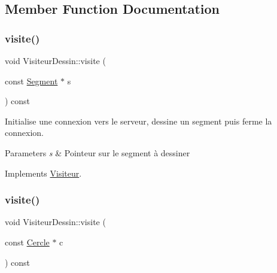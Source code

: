 \subsection{Member Function Documentation}
\mbox{\label{class_visiteur_dessin_a39d12a331fcc80c183fc706cdb2d394a}} 
\subsubsection{\texorpdfstring{visite()}{visite()}\hspace{0.1cm}{\footnotesize\ttfamily [1/5]}}
{\footnotesize\ttfamily void Visiteur\+Dessin\+::visite (\begin{DoxyParamCaption}\item[{const \hyperlink{class_segment}{Segment} $\ast$}]{s }\end{DoxyParamCaption}) const\hspace{0.3cm}{\ttfamily [virtual]}}



Initialise une connexion vers le serveur, dessine un segment puis ferme la connexion. 


\begin{DoxyParams}{Parameters}
{\em s} & Pointeur sur le segment à dessiner \\
\hline
\end{DoxyParams}


Implements \hyperlink{class_visiteur_ab63ea127a0ac3cfa12c4cbdd9d9c8eb2}{Visiteur}.

\mbox{\label{class_visiteur_dessin_ab757769d7c4bf7eac6263eecc8554896}} 
\subsubsection{\texorpdfstring{visite()}{visite()}\hspace{0.1cm}{\footnotesize\ttfamily [2/5]}}
{\footnotesize\ttfamily void Visiteur\+Dessin\+::visite (\begin{DoxyParamCaption}\item[{const \hyperlink{class_cercle}{Cercle} $\ast$}]{c }\end{DoxyParamCaption}) const\hspace{0.3cm}{\ttfamily [virtual]}}




